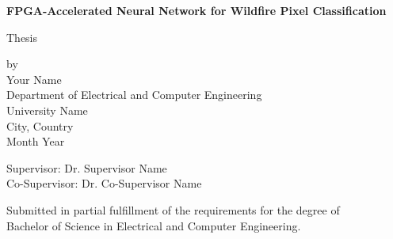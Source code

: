 \begin{titlepage}
    \centering
    
    \vspace*{2cm}
    {\LARGE\bfseries FPGA-Accelerated Neural Network for Wildfire Pixel Classification\\[0.5cm]}
    
    {\Large Thesis}\par
    \vspace{1cm}
    {\large by}\\[0.2cm]
    {\Large Your Name}\\[0.5cm]

    \vspace{1.5cm}
    {\large Department of Electrical and Computer Engineering}\\
    {\large University Name}\\
    {\large City, Country}\\
    {\large Month Year}

    \vfill
    Supervisor: Dr. Supervisor Name\\
    Co-Supervisor: Dr. Co-Supervisor Name

    \vspace{1cm}
    Submitted in partial fulfillment of the requirements for the degree of \\
    Bachelor of Science in Electrical and Computer Engineering.
\end{titlepage}

